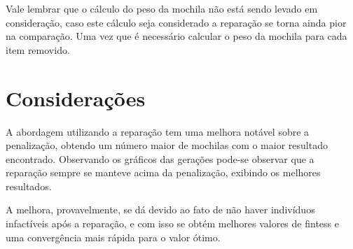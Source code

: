 \documentclass[11pt]{article}
\begin{document}
Vale lembrar que o cálculo do peso da mochila não está sendo levado em consideração, caso este cálculo seja considerado a reparação se torna ainda pior na comparação. Uma vez que é necessário calcular o peso da mochila para cada item removido.

\section{Considerações}

A abordagem utilizando a reparação tem uma melhora notável sobre a penalização, obtendo um número maior de mochilas com o maior resultado encontrado. Observando os gráficos das gerações pode-se observar que a reparação sempre se manteve acima da penalização, exibindo os melhores resultados. 

A melhora, provavelmente, se dá devido ao fato de não haver indivíduos infactíveis após a reparação, e com isso se obtém melhores valores de fintess e uma convergência mais rápida para o valor ótimo.
\end{document}
